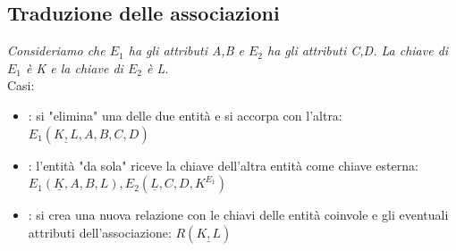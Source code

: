 \documentclass[12pt, a4paper]{report}
\begin{document}
    \subsection{Traduzione delle associazioni}
    \begin{center}
    \end{center}
    \textit{Consideriamo che $E_{1}$ ha gli attributi A,B e $E_{2}$ ha gli attributi C,D. La chiave di $E_{1}$ è K e la chiave di $E_{2}$ è L.}\\
    Casi:
    \begin{itemize}
        \item {}: si "elimina" una delle due entità e si accorpa con l'altra: $E_{1}(\underline{K,L},A,B,C,D)$
        \item {}: l'entità "da sola" riceve la chiave dell'altra entità come chiave esterna: $E_{1}(\underline{K},A,B,L),E_{2}(\underline{L},C,D, K^{E_{1}})$
        \item {}: si crea una nuova relazione con le chiavi delle entità coinvole e gli eventuali attributi dell'associazione: $R(\underline{K,L})$
    \end{itemize}
\end{document}
